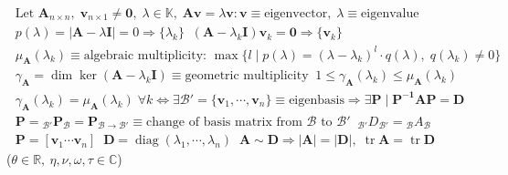 \begin{align*}
&\text{Let }\mathbf{A}_{n\times n},\;\mathbf{v}_{n\times1}\!\neq\!\mathbf{0},\;\lambda\!\in\!\mathbb{K},\;\mathbf{Av}\!=\!\lambda\mathbf{v}:\mathbf{v}\!\equiv\!\text{eigenvector},\;\lambda\!\equiv\!\text{eigenvalue} \\
&p(\lambda)\!=\!|\mathbf{A}\!-\!\lambda\mathbf{I}|\!=\!0\Rightarrow\{\lambda_k\}\;\;(\mathbf{A}\!-\!\lambda_k\mathbf{I})\mathbf{v}_k\!=\!\mathbf{0}\Rightarrow\{\mathbf{v}_k\} \\
&\mu_{\mathbf{A}}(\lambda_k)\!\equiv\!\text{algebraic multiplicity: }\max\{l\;|\;p(\lambda)\!=\!(\lambda\!-\!\lambda_k)^l\!\cdot\!q(\lambda),\;q(\lambda_k)\!\neq\!0\} \\
&\gamma_{\mathbf{A}}\!=\!\dim\ker(\mathbf{A}\!-\!\lambda_k\mathbf{I})\!\equiv\!\text{geometric multiplicity}\;\;1\!\leq\!\gamma_{\mathbf{A}}(\lambda_k)\!\leq\!\mu_\mathbf{A}(\lambda_k) \\
 &\gamma_{\mathbf{A}}(\lambda_k)\!=\!\mu_{\mathbf{A}}(\lambda_k)\;\forall k\Leftrightarrow\exists\mathcal{B'}\!=\!\{\mathbf{v}_1,\cdots,\mathbf{v}_n\}\!\equiv\!\text{eigenbasis}\Rightarrow\exists\mathbf{P}\;|\;\mathbf{P^{-1}AP}\!=\!\mathbf{D} \\
&\mathbf{P}\!=\!{}_{\mathcal{B'\!}}\mathbf{P}_{\mathcal{B}}\!=\!\mathbf{P}_{\mathcal{B\rightarrow B'}}\!\equiv\!\text{change of basis matrix from $\mathcal{B}$ to $\mathcal{B'}$}\;\;{}_{\mathcal{B}'}D_{\mathcal{B}'}\!=\!{}_{\mathcal{B}}A_{\mathcal{B}} \\
&\mathbf{P}\!=\![\mathbf{v}_1\cdots\mathbf{v}_n]\;\;\mathbf{D}\!=\!\operatorname{diag}(\lambda_1,\cdots,\lambda_n)\;\;\mathbf{A\!\sim\! D}\Rightarrow|\mathbf{A}|\!=\!|\mathbf{D}|,\;\operatorname{tr}\mathbf{A}\!=\!\operatorname{tr}\mathbf{D}\end{align*}
 \underline{} {\normalfont\scriptsize \ ($\theta \in \mathbb{R},\ \eta, \nu, \omega, \tau \in \mathbb{C}$)}
